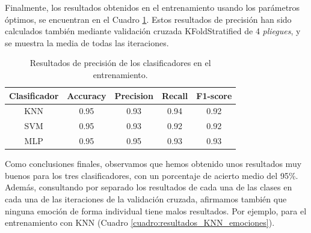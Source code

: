 Finalmente, los resultados obtenidos en el entrenamiento usando los parámetros óptimos, se encuentran en el Cuadro \ref{cuadro:resultados}. Estos resultados de precisión han sido calculados también mediante validación cruzada KFoldStratified de 4 \textit{pliegues}, y se muestra la media de todas las iteraciones.\\

\begin{table}[H]
\begin{center}
\begin{tabular}{|c|c|c|c|c|}
     \hline
    \textbf{Clasificador} & \textbf{Accuracy} & \textbf{Precision} & \textbf{Recall} & \textbf{F1-score}\\
    \hline
     KNN & 0.95 & 0.93 & 0.94 & 0.92\\
     SVM & 0.95 & 0.93 & 0.92 & 0.92\\
     MLP & 0.95 & 0.95 & 0.93 & 0.93\\
     \hline
 \end{tabular}
 \captionsetup{justification=centering}
\caption{Resultados de precisión de los clasificadores en el entrenamiento.}
\label{cuadro:resultados}
\end{center}
\end{table}

Como conclusiones finales, observamos que hemos obtenido unos resultados muy buenos para los tres clasificadores, con un porcentaje de acierto medio del 95\%. Además, consultando por separado los resultados de cada una de las clases en cada una de las iteraciones de la validación cruzada, afirmamos también que ninguna emoción de forma individual tiene malos resultados. Por ejemplo, para el entrenamiento con KNN (Cuadro \ref{cuadro:resultados_KNN_emociones}).\\

